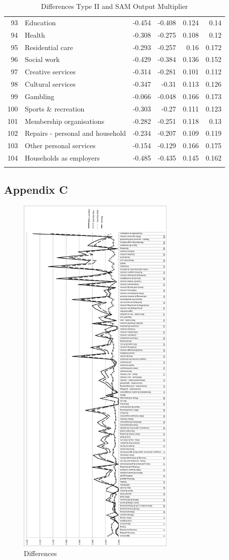 \begin{longtable}{@{\extracolsep{\fill}}rlrrrr@{}}
    93    & Education & -0.454 & -0.408 & 0.124 & 0.14 \\
    94    & Health & -0.308 & -0.275 & 0.108 & 0.12 \\
    95    & Residential care & -0.293 & -0.257 & 0.16  & 0.172 \\
    96    & Social work & -0.429 & -0.384 & 0.136 & 0.152 \\
    97    & Creative services & -0.314 & -0.281 & 0.101 & 0.112 \\
    98    & Cultural services & -0.347 & -0.31 & 0.113 & 0.126 \\
    99    & Gambling & -0.066 & -0.048 & 0.166 & 0.173 \\
    100   & Sports \& recreation & -0.303 & -0.27 & 0.111 & 0.123 \\
    101   & Membership organisations & -0.282 & -0.251 & 0.118 & 0.13 \\
    102   & Repairs - personal and household & -0.234 & -0.207 & 0.109 & 0.119 \\
    103   & Other personal services & -0.154 & -0.129 & 0.166 & 0.175 \\
    104   & Households as employers & -0.485 & -0.435 & 0.145 & 0.162 \\
\hline
\caption{Differences Type II and SAM Output Multiplier}
\end{longtable}

\newpage

\subsection{Appendix C}
\label{sec:4.7.3}

\begin{figure}[hb]
  \centering
  \includegraphics[width=3in]{DifferencesChart}
  \caption{Differences}
\end{figure}
